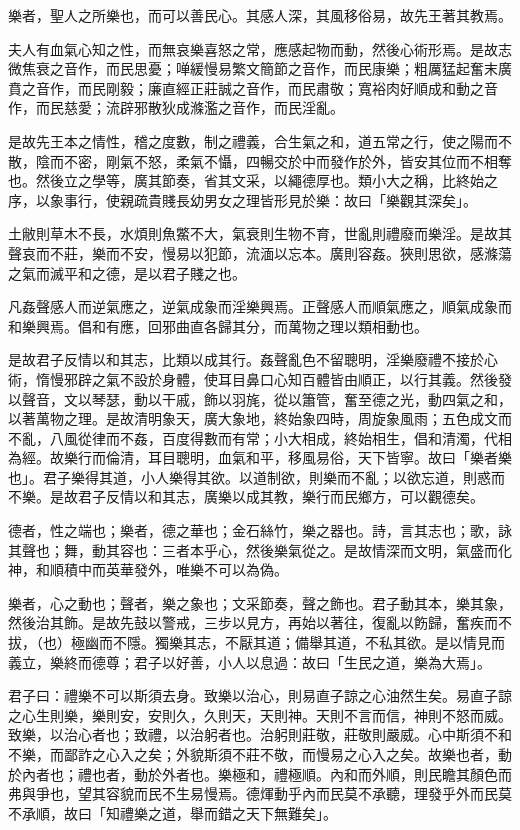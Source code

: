 \begin{pinyinscope}
樂者，聖人之所樂也，而可以善民心。其感人深，其風移俗易，故先王著其教焉。

夫人有血氣心知之性，而無哀樂喜怒之常，應感起物而動，然後心術形焉。是故志微焦衰之音作，而民思憂；啴緩慢易繁文簡節之音作，而民康樂；粗厲猛起奮末廣賁之音作，而民剛毅；廉直經正莊誠之音作，而民肅敬；寬裕肉好順成和動之音作，而民慈愛；流辟邪散狄成滌濫之音作，而民淫亂。

是故先王本之情性，稽之度數，制之禮義，合生氣之和，道五常之行，使之陽而不散，陰而不密，剛氣不怒，柔氣不懾，四暢交於中而發作於外，皆安其位而不相奪也。然後立之學等，廣其節奏，省其文采，以繩德厚也。類小大之稱，比終始之序，以象事行，使親疏貴賤長幼男女之理皆形見於樂：故曰「樂觀其深矣」。

土敝則草木不長，水煩則魚鱉不大，氣衰則生物不育，世亂則禮廢而樂淫。是故其聲哀而不莊，樂而不安，慢易以犯節，流湎以忘本。廣則容姦。狹則思欲，感滌蕩之氣而滅平和之德，是以君子賤之也。

凡姦聲感人而逆氣應之，逆氣成象而淫樂興焉。正聲感人而順氣應之，順氣成象而和樂興焉。倡和有應，回邪曲直各歸其分，而萬物之理以類相動也。

是故君子反情以和其志，比類以成其行。姦聲亂色不留聰明，淫樂廢禮不接於心術，惰慢邪辟之氣不設於身體，使耳目鼻口心知百體皆由順正，以行其義。然後發以聲音，文以琴瑟，動以干戚，飾以羽旄，從以簫管，奮至德之光，動四氣之和，以著萬物之理。是故清明象天，廣大象地，終始象四時，周旋象風雨；五色成文而不亂，八風從律而不姦，百度得數而有常；小大相成，終始相生，倡和清濁，代相為經。故樂行而倫清，耳目聰明，血氣和平，移風易俗，天下皆寧。故曰「樂者樂也」。君子樂得其道，小人樂得其欲。以道制欲，則樂而不亂；以欲忘道，則惑而不樂。是故君子反情以和其志，廣樂以成其教，樂行而民鄉方，可以觀德矣。

德者，性之端也；樂者，德之華也；金石絲竹，樂之器也。詩，言其志也；歌，詠其聲也；舞，動其容也：三者本乎心，然後樂氣從之。是故情深而文明，氣盛而化神，和順積中而英華發外，唯樂不可以為偽。

樂者，心之動也；聲者，樂之象也；文采節奏，聲之飾也。君子動其本，樂其象，然後治其飾。是故先鼓以警戒，三步以見方，再始以著往，復亂以飭歸，奮疾而不拔，（也）極幽而不隱。獨樂其志，不厭其道；備舉其道，不私其欲。是以情見而義立，樂終而德尊；君子以好善，小人以息過：故曰「生民之道，樂為大焉」。

君子曰：禮樂不可以斯須去身。致樂以治心，則易直子諒之心油然生矣。易直子諒之心生則樂，樂則安，安則久，久則天，天則神。天則不言而信，神則不怒而威。致樂，以治心者也；致禮，以治躬者也。治躬則莊敬，莊敬則嚴威。心中斯須不和不樂，而鄙詐之心入之矣；外貌斯須不莊不敬，而慢易之心入之矣。故樂也者，動於內者也；禮也者，動於外者也。樂極和，禮極順。內和而外順，則民瞻其顏色而弗與爭也，望其容貌而民不生易慢焉。德煇動乎內而民莫不承聽，理發乎外而民莫不承順，故曰「知禮樂之道，舉而錯之天下無難矣」。


\end{pinyinscope}
